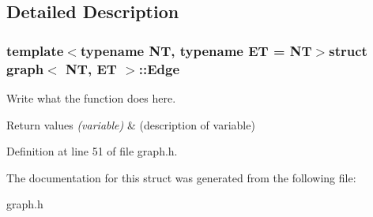 \subsection{Detailed Description}
\subsubsection*{template$<$typename N\+T, typename E\+T = N\+T$>$struct graph$<$ N\+T, E\+T $>$\+::\+Edge}

Write what the function does here. 


\begin{DoxyRetVals}{Return values}
{\em (variable)} & (description of variable) \\
\hline
\end{DoxyRetVals}


Definition at line 51 of file graph.\+h.



The documentation for this struct was generated from the following file\+:\begin{DoxyCompactItemize}
\item 
graph.\+h\end{DoxyCompactItemize}

